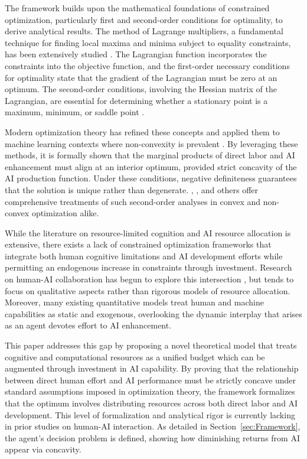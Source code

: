 \documentclass[11pt]{article}
\theoremstyle{definition}
\theoremstyle{remark}
\begin{document}
The framework builds upon the mathematical foundations of constrained optimization, particularly first and second-order conditions for optimality, to derive analytical results. The method of Lagrange multipliers, a fundamental technique for finding local maxima and minima subject to equality constraints, has been extensively studied \citep{flaam2008slopes,jie2021computing}. The Lagrangian function incorporates the constraints into the objective function, and the first-order necessary conditions for optimality state that the gradient of the Lagrangian must be zero at an optimum. The second-order conditions, involving the Hessian matrix of the Lagrangian, are essential for determining whether a stationary point is a maximum, minimum, or saddle point \citep{hallak2020finding}.

Modern optimization theory has refined these concepts and applied them to machine learning contexts where non-convexity is prevalent \citep{dauphin2014identifying}. By leveraging these methods, it is formally shown that the marginal products of direct labor and AI enhancement must align at an interior optimum, provided strict concavity of the AI production function. Under these conditions, negative definiteness guarantees that the solution is unique rather than degenerate. \cite{sekeris2024conflict}, \cite{dehm2023non}, and others offer comprehensive treatments of such second-order analyses in convex and non-convex optimization alike.

While the literature on resource-limited cognition \citep{norman1975data,kahneman1973attention} and AI resource allocation \citep{snoek2012practical, gu2022ai} is extensive, there exists a lack of constrained optimization frameworks that integrate both human cognitive limitations and AI development efforts while permitting an endogenous increase in constraints through investment. Research on human-AI collaboration has begun to explore this intersection \citep{cappelli2023artificial,westby2023collective}, but tends to focus on qualitative aspects rather than rigorous models of resource allocation. Moreover, many existing quantitative models treat human and machine capabilities as static and exogenous, overlooking the dynamic interplay that arises as an agent devotes effort to AI enhancement.

This paper addresses this gap by proposing a novel theoretical model that treats cognitive and computational resources as a unified budget which can be augmented through investment in AI capability. By proving that the relationship between direct human effort and AI performance must be strictly concave under standard assumptions imposed in optimization theory, the framework formalizes that the optimum involves distributing resources across both direct labor and AI development. This level of formalization and analytical rigor is currently lacking in prior studies on human-AI interaction. As detailed in Section~\ref{sec:Framework}, the agent’s decision problem is defined, showing how diminishing returns from AI appear via concavity.
\end{document}
